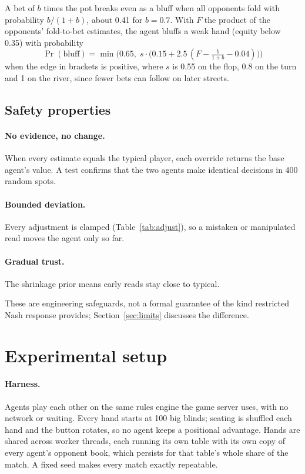 A bet of $b$ times the pot breaks even as a bluff when all opponents fold with probability
$b/(1+b)$, about 0.41 for $b = 0.7$. With $F$ the product of the opponents' fold-to-bet
estimates, the agent bluffs a weak hand (equity below 0.35) with probability
\begin{equation}
\label{eq:bluff}
\Pr(\text{bluff}) = \min\!\Big(0.65,\; s\cdot\big(0.15 + 2.5\,(F - \tfrac{b}{1+b} - 0.04)\big)\Big)
\end{equation}
when the edge in brackets is positive, where $s$ is 0.55 on the flop, 0.8 on the turn and 1 on
the river, since fewer bets can follow on later streets.

\subsection{Safety properties}

\paragraph{No evidence, no change.} When every estimate equals the typical player, each
override returns the base agent's value. A test confirms that the two agents make identical
decisions in 400 random spots.

\paragraph{Bounded deviation.} Every adjustment is clamped (Table~\ref{tab:adjust}), so a
mistaken or manipulated read moves the agent only so far.

\paragraph{Gradual trust.} The shrinkage prior means early reads stay close to typical.

These are engineering safeguards, not a formal guarantee of the kind restricted Nash
response provides; Section~\ref{sec:limits} discusses the difference.

\section{Experimental setup}

\paragraph{Harness.} Agents play each other on the same rules engine the game server uses,
with no network or waiting. Every hand starts at 100 big blinds; seating is shuffled each hand
and the button rotates, so no agent keeps a positional advantage. Hands are shared across
worker threads, each running its own table with its own copy of every agent's opponent book,
which persists for that table's whole share of the match. A fixed seed makes every match
exactly repeatable.

